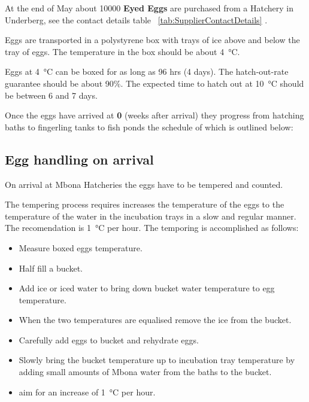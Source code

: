 At the end of May about 10000 {\bf Eyed Eggs} are purchased from a Hatchery in 
Underberg, see the contact details table ~\ref{tab:SupplierContactDetails} .

Eggs are transported in a polystyrene box with trays of ice above and below the tray of eggs.
    The temperature in the box should be about  \SI{4}{\celsius}.

Eggs at  \SI{4}{\celsius} can be boxed for as long as 96 hrs (4 days).
The hatch-out-rate guarantee should be about 90\%.
The expected time to hatch out at  \SI{10}{\celsius} should be between 6 and 7 days.
    
Once the eggs have arrived at {\bf 0 \W} (weeks after arrival) they progress from 
hatching baths to fingerling tanks to fish ponds the schedule of which is outlined below:


\subsection{Egg handling on arrival}

On arrival at Mbona Hatcheries the eggs have to be tempered and  counted.

    
The tempering process requires increases the temperature of the eggs 
               to the temperature of the water in the incubation trays in a slow and regular manner. 
               The recomendation is  \SI{1}{\celsius} per hour.
               The temporing is accomplished as follows:
         \begin{itemize}
             \item[] Measure boxed eggs temperature.
             \item[] Half fill a bucket.
             \item[] Add ice or iced water to bring down bucket water temperature to egg temperature.
             \item[] When the two temperatures are equalised remove the ice from the bucket.
             \item[] Carefully add eggs to bucket and rehydrate eggs.
             \item[] Slowly bring the bucket temperature up to incubation tray temperature 
                        by adding small amounts of Mbona water from the baths to the bucket.
             \item[] aim for an increase of  \SI{1}{\celsius} per hour.
         \end{itemize}
         
